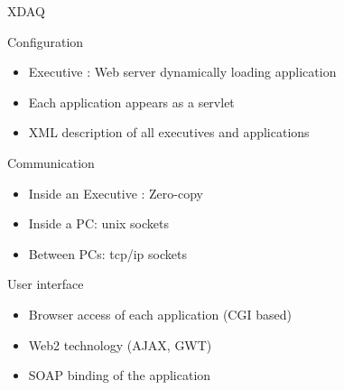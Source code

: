 \documentclass[10pt]{beamer}
\begin{document}
\begin{frame}[shrink=5]{XDAQ}
 \begin{block}{Configuration}
  \begin{itemize}
  \item Executive : Web server dynamically loading application
  \item Each application appears as a servlet
  \item XML description of all executives and applications 
  \end{itemize}
  \end{block}
  \pause \begin{block}{Communication}
  \begin{itemize}
  \item Inside an Executive : Zero-copy
  \item Inside a PC: unix sockets
  \item Between PCs: tcp/ip sockets
  \end{itemize}
  \end{block}
  \pause 
  \begin{block}{User interface}
    \begin{itemize}
    \item Browser access of each application (CGI based)
    \item Web2 technology (AJAX, GWT)
    \item SOAP binding of the application
    \end{itemize}
  \end{block}
  
\end{frame}
\end{document}
